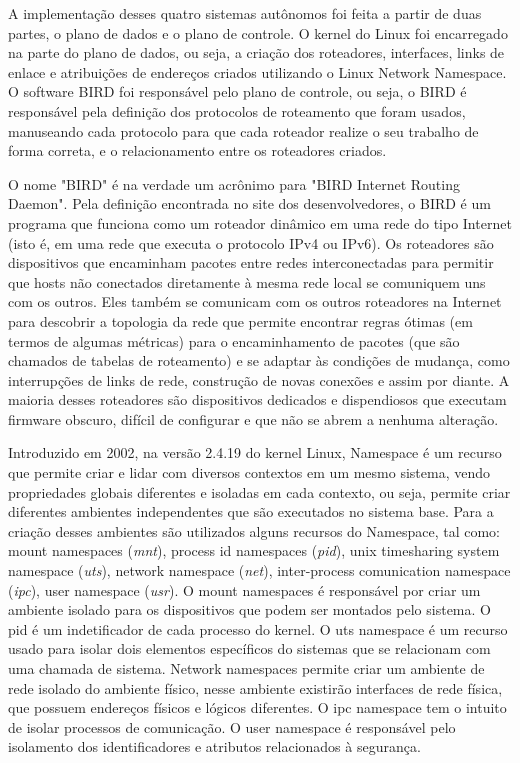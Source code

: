 \documentclass[12pt,a4paper]{report}
\begin{document}
A implementa\c{c}\~ao desses quatro sistemas aut\^onomos foi feita a partir de duas partes, o plano de dados e o plano de controle. O kernel do Linux foi encarregado na parte do plano de dados, ou seja, a cria\c{c}\~ao dos roteadores, interfaces, links de enlace e atribui\c{c}\~oes de endere\c{c}os criados utilizando o Linux Network Namespace. O software BIRD foi respons\'avel pelo plano de controle, ou seja, o BIRD \'e respons\'avel pela defini\c{c}\~ao dos protocolos de roteamento que foram usados, manuseando cada protocolo para que cada roteador realize o seu trabalho de forma correta, e o relacionamento entre os roteadores criados.

O nome "BIRD" \'e na verdade um acr\^onimo para "BIRD Internet Routing Daemon". Pela defini\c{c}\~ao encontrada no site dos desenvolvedores, o BIRD \'e um programa que funciona como um roteador din\^amico em uma rede do tipo Internet (isto \'e, em uma rede que executa o protocolo IPv4 ou IPv6). Os roteadores s\~ao dispositivos que encaminham pacotes entre redes interconectadas para permitir que hosts n\~ao conectados diretamente \`a mesma rede local se comuniquem uns com os outros. Eles tamb\'em se comunicam com os outros roteadores na Internet para descobrir a topologia da rede que permite encontrar regras \'otimas (em termos de algumas m\'etricas) para o encaminhamento de pacotes (que s\~ao chamados de tabelas de roteamento) e se adaptar \`as condi\c{c}\~oes de mudan\c{c}a, como interrup\c{c}\~oes de links de rede, constru\c{c}\~ao de novas conex\~oes e assim por diante. A maioria desses roteadores s\~ao dispositivos dedicados e dispendiosos que executam firmware obscuro, dif\'icil de configurar e que n\~ao se abrem a nenhuma altera\c{c}\~ao.\cite{BIRD} 

Introduzido em 2002, na vers\~ao 2.4.19 do kernel Linux, Namespace \'e um recurso que permite criar e lidar com diversos contextos em um mesmo sistema, vendo propriedades globais diferentes e isoladas em cada contexto, ou seja, permite criar diferentes ambientes independentes que s\~ao executados no sistema base. Para a cria\c{c}\~ao desses ambientes s\~ao utilizados alguns recursos do Namespace\cite{namespace}, tal como: mount namespaces (\textit{mnt}), process id namespaces (\textit{pid}), unix timesharing system namespace (\textit{uts}), network namespace (\textit{net}), inter-process comunication namespace (\textit{ipc}), user namespace (\textit{usr}). O mount namespaces \'e respons\'avel por criar um ambiente isolado para os dispositivos que podem ser montados pelo sistema\cite{mount}. O pid \'e um indetificador de cada processo do kernel\cite{pid}. O uts namespace \'e um recurso usado para isolar dois elementos espec\'ificos do sistemas que se relacionam com uma chamada de sistema\cite{namespace}. Network namespaces permite criar um ambiente de rede isolado do ambiente f\'isico, nesse ambiente existir\~ao interfaces de rede f\'isica, que possuem endere\c{c}os f\'isicos e l\'ogicos diferentes\cite{net}. O ipc namespace tem o intuito de isolar processos de comunica\c{c}\~ao\cite{namespace}. O user namespace \'e respons\'avel pelo isolamento dos identificadores e atributos relacionados \`a seguran\c{c}a.\cite{user}
\end{document}
